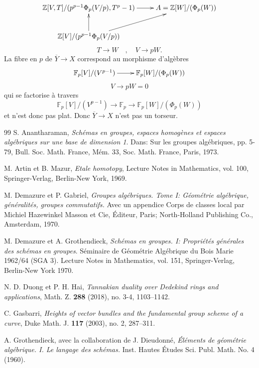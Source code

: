 \documentclass[11pt]{amsart}
\numberwithin{equation}{section}
\theoremstyle{definition}
\theoremstyle{remark}
\newcommand{\bF}{{\mathbb F}}
\newcommand{\bZ}{{\mathbb Z}}
\begin{document}
$$\xymatrix{\bZ [V,T] /( p^{p-1}\Phi _p (V/p), T^p -1) \ar[r] & A= \bZ [W] /(\Phi _p (W)) \\
\bZ [V]/ (p^{p-1} \Phi _p (V/p))\ar[u] \ar[ur]&\\
}$$
$$T \to W \quad , \quad V \to pW.$$
La fibre en $p$ de $\overline Y \to X$ correspond au morphisme d'alg\`ebres
$$\xymatrix{\bF _p [V]/ (V^{p-1})\ar[r] & \bF _p [W] /(\Phi _p (W))\\
}$$
$$V \to pW=0$$
qui se factorise \`a travers  $$\bF _p [V]/ (V^{p-1})\to \bF _p \to \bF _p [W] /(\Phi _p (W))$$ et n'est donc pas plat. Donc $\overline Y \to X$ n'est pas un torseur.






\begin{thebibliographyfr}{99}
 S. Anantharaman, \emph{Sch\'emas en groupes, espaces homog\`enes et espaces alg\'ebriques
sur une base de dimension 1}. Dans: Sur les groupes alg\'ebriques, pp. 5-79, Bull. Soc. Math. France, M\'em. 33, Soc. Math.
France, Paris, 1973.

 M. Artin et B. Mazur, \emph{Etale homotopy}, Lecture Notes in Mathematics, vol. 100, Springer-Verlag, Berlin-New York, 1969.

M. Demazure et P. Gabriel, \emph{Groupes alg\'ebriques. Tome I: G\'eom\'etrie alg\'ebrique, g\'en\'eralit\'es, groupes commutatifs.}
Avec un appendice Corps de classes local par Michiel Hazewinkel
Masson et Cie, \'Editeur, Paris;  North-Holland Publishing Co., Amsterdam, 1970.

M. Demazure et A. Grothendieck, \emph{Sch\'emas en groupes. I: Propri\'et\'es g\'en\'erales des sch\'emas en groupes}. S\'eminaire de G\'eom\'etrie Alg\'ebrique du Bois Marie 1962/64 (SGA 3). Lecture Notes in Mathematics, vol. 151, Springer-Verlag, Berlin-New York 1970.

 N. D. Duong et P. H. Hai, \emph{Tannakian duality over Dedekind rings and applications}, Math. Z.
{\bf 288} (2018), no. 3-4, 1103--1142.

 C. Gasbarri, \emph{Heights of vector bundles and the fundamental group scheme of a curve}, Duke Math. J. {\bf 117} (2003), no. 2, 287--311.

 A. Grothendieck, avec la collaboration de J. Dieudonn\'e, \emph{\'El\'ements de  g\'eom\'etrie alg\'ebrique. I. Le langage des sch\'emas.} 
Inst. Hautes \'Etudes Sci. Publ. Math. No. 4 (1960).


\end{thebibliographyfr}
\end{document}
